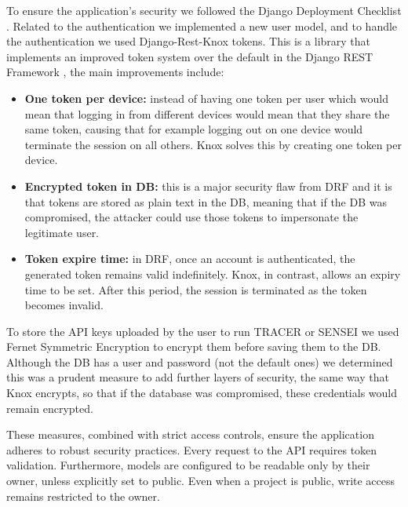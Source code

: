 To ensure the application's security we followed the Django Deployment Checklist \autocite{DeploymentChecklistDjango}.
Related to the authentication we implemented a new user model,
and to handle the authentication we used Django-Rest-Knox \autocite{DjangoRestKnox} tokens.
This is a library that implements an improved token system over the default in the Django REST Framework \autocite{DjangoRESTFramework},
the main improvements include:
\begin{itemize}
  \item \textbf{One token per device:}
    instead of having one token per user
    which would mean that logging in from different devices
    would mean that they share the same token,
    causing that for example
    logging out on one device would terminate the session on all others.
    Knox solves this by creating one token per device.

  \item \textbf{Encrypted token in \ac{DB}:}
    this is a major security flaw from \ac{DRF}
    and it is that tokens are stored as plain text in the \ac{DB},
    meaning that if the \ac{DB} was compromised,
    the attacker could use those tokens to impersonate the legitimate user.

  \item \textbf{Token expire time:}
    in \ac{DRF}, once an account is authenticated, the generated token remains valid indefinitely.
    Knox, in contrast, allows an expiry time to be set.
    After this period, the session is terminated as the token becomes invalid.
\end{itemize}

To store the \ac{API} keys uploaded by the user to run \ac{TRACER} or SENSEI
we used Fernet Symmetric Encryption \autocite{FernetSymmetricEncryption}
to encrypt them before saving them to the \ac{DB}.
Although the \ac{DB} has a user and password (not the default ones)
we determined this was a prudent measure to add further layers of security,
the same way that Knox encrypts, so that
if the database was compromised, these credentials would remain encrypted.

These measures, combined with strict access controls,
ensure the application adheres to robust security practices.
Every request to the \ac{API} requires token validation.
Furthermore, models are configured to be readable only by their owner,
unless explicitly set to public.
Even when a project is public, write access remains restricted to the owner.

